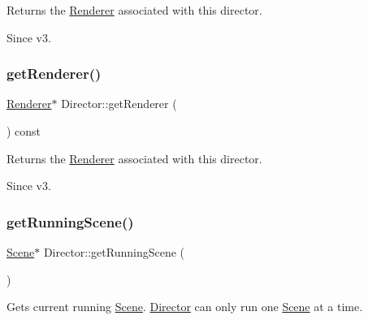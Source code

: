 Returns the \hyperlink{classRenderer}{Renderer} associated with this director. \begin{DoxySince}{Since}
v3. 
\end{DoxySince}
\mbox{\label{classDirector_a45e283c703cf856467ccbe484da739c5}} 
\subsubsection{\texorpdfstring{get\+Renderer()}{getRenderer()}\hspace{0.1cm}{\footnotesize\ttfamily [2/2]}}
{\footnotesize\ttfamily \hyperlink{classRenderer}{Renderer}$\ast$ Director\+::get\+Renderer (\begin{DoxyParamCaption}{ }\end{DoxyParamCaption}) const\hspace{0.3cm}{\ttfamily [inline]}}

Returns the \hyperlink{classRenderer}{Renderer} associated with this director. \begin{DoxySince}{Since}
v3. 
\end{DoxySince}
\mbox{\label{classDirector_a674852932c4b153b4e1ff4ee51ac07b8}} 
\subsubsection{\texorpdfstring{get\+Running\+Scene()}{getRunningScene()}\hspace{0.1cm}{\footnotesize\ttfamily [1/2]}}
{\footnotesize\ttfamily \hyperlink{classScene}{Scene}$\ast$ Director\+::get\+Running\+Scene (\begin{DoxyParamCaption}{ }\end{DoxyParamCaption})\hspace{0.3cm}{\ttfamily [inline]}}

Gets current running \hyperlink{classScene}{Scene}. \hyperlink{classDirector}{Director} can only run one \hyperlink{classScene}{Scene} at a time. \mbox{\label{classDirector_a674852932c4b153b4e1ff4ee51ac07b8}} 
